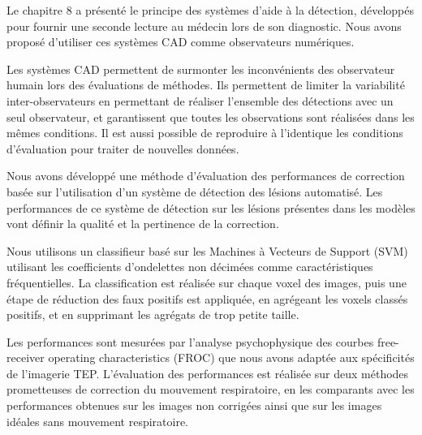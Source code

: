 Le chapitre 8 a présenté le principe des systèmes d'aide à la détection, développés pour fournir une seconde lecture au médecin lors de son diagnostic. Nous avons proposé d'utiliser ces systèmes CAD comme observateurs numériques.

Les systèmes CAD permettent de surmonter les inconvénients des observateur humain lors des évaluations de méthodes. Ils permettent de limiter la variabilité inter-observateurs en permettant de réaliser l'ensemble des détections avec un seul observateur, et garantissent que toutes les observations sont réalisées dans les mêmes conditions. Il est aussi possible de reproduire à l'identique les conditions d'évaluation pour traiter de nouvelles données.

Nous avons développé une méthode d'évaluation des performances de correction basée sur l'utilisation d'un système de détection des lésions automatisé. Les performances de ce système de détection sur les lésions présentes dans les modèles vont définir la qualité et la pertinence de la correction. 

Nous utilisons un classifieur basé sur les Machines à Vecteurs de Support (SVM) utilisant les coefficients d'ondelettes non décimées comme caractéristiques fréquentielles. La classification est réalisée sur chaque voxel des images, puis une étape de réduction des faux positifs est appliquée, en agrégeant les voxels classés positifs, et en supprimant les agrégats de trop petite taille.

Les performances sont mesurées par l’analyse psychophysique des courbes free-receiver operating characteristics (FROC) que nous avons adaptée aux spécificités de l’imagerie TEP. L’évaluation des performances est réalisée sur deux méthodes prometteuses de correction du mouvement respiratoire, en les comparants avec les performances obtenues sur les images non corrigées ainsi que sur les images idéales sans mouvement respiratoire.
